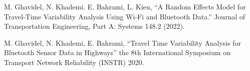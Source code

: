 \begin{zitemize}
\item M. Ghavidel, N. Khademi. E. Bahrami, L. Kieu, “A Random Effects Model for Travel-Time Variability Analysis Using Wi-Fi and Bluetooth Data.” Journal of Transportation Engineering, Part A: Systems 148.2 (2022).
\item M. Ghavidel, N. Khademi, E. Bahrami, “Travel Time Variability Analysis for Bluetooth Sensor Data in Highways” the 8th International Symposium on Transport Network Reliability (INSTR) 2020.
\end{zitemize}
